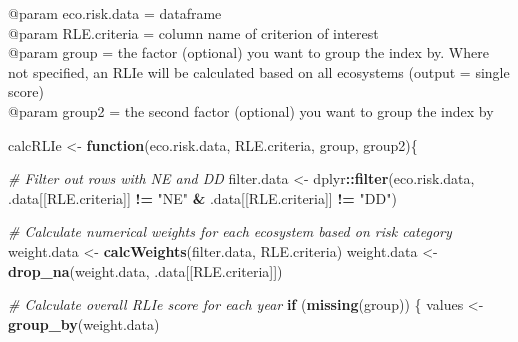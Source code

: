 \documentclass[]{article}
\newenvironment{Shaded}{\begin{snugshade}}{\end{snugshade}}
\newcommand{\KeywordTok}[1]{\textcolor[rgb]{0.13,0.29,0.53}{\textbf{#1}}}
\newcommand{\StringTok}[1]{\textcolor[rgb]{0.31,0.60,0.02}{#1}}
\newcommand{\CommentTok}[1]{\textcolor[rgb]{0.56,0.35,0.01}{\textit{#1}}}
\newcommand{\ControlFlowTok}[1]{\textcolor[rgb]{0.13,0.29,0.53}{\textbf{#1}}}
\newcommand{\OperatorTok}[1]{\textcolor[rgb]{0.81,0.36,0.00}{\textbf{#1}}}
\newcommand{\NormalTok}[1]{#1}
\begin{document}
@param eco.risk.data = dataframe\\
@param RLE.criteria = column name of criterion of interest\\
@param group = the factor (optional) you want to group the index by.
Where not specified, an RLIe will be calculated based on all ecosystems
(output = single score)\\
@param group2 = the second factor (optional) you want to group the index
by

\begin{Shaded}
\begin{Highlighting}[]
\NormalTok{calcRLIe <-}\StringTok{ }\ControlFlowTok{function}\NormalTok{(eco.risk.data, RLE.criteria, group, group2)\{}
  
  \CommentTok{# Filter out rows with NE and DD}
\NormalTok{  filter.data <-}\StringTok{ }\NormalTok{dplyr}\OperatorTok{::}\KeywordTok{filter}\NormalTok{(eco.risk.data, .data[[RLE.criteria]] }\OperatorTok{!=}\StringTok{ "NE"} \OperatorTok{&}\StringTok{ }\NormalTok{.data[[RLE.criteria]] }\OperatorTok{!=}\StringTok{ "DD"}\NormalTok{)}
  
  \CommentTok{# Calculate numerical weights for each ecosystem based on risk category}
\NormalTok{  weight.data <-}\StringTok{ }\KeywordTok{calcWeights}\NormalTok{(filter.data, RLE.criteria)}
\NormalTok{  weight.data <-}\StringTok{ }\KeywordTok{drop_na}\NormalTok{(weight.data, .data[[RLE.criteria]])}
  
  \CommentTok{# Calculate overall RLIe score for each year}
  \ControlFlowTok{if}\NormalTok{ (}\KeywordTok{missing}\NormalTok{(group)) \{}
\NormalTok{    values <-}\StringTok{ }\KeywordTok{group_by}\NormalTok{(weight.data)}
    

\end{Highlighting}
\end{Shaded}
\end{document}
